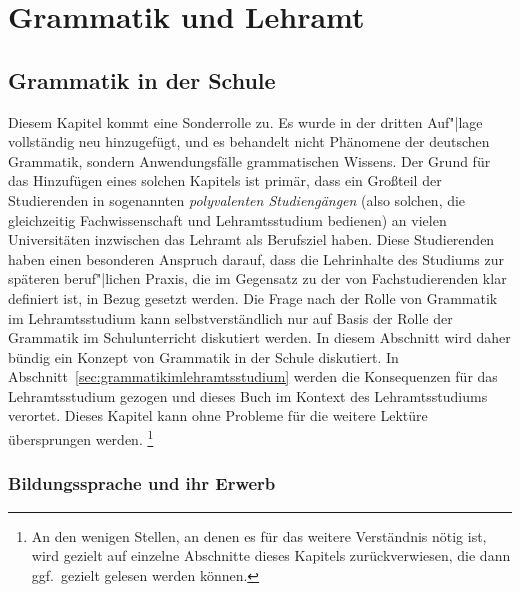 \chapter{Grammatik und Lehramt}
\label{sec:grammatikundlehramt}


\section{Grammatik in der Schule}
\label{sec:grammatikinderschule}

Diesem Kapitel kommt eine Sonderrolle zu.
Es wurde in der dritten Auf"|lage vollständig neu hinzugefügt, und es behandelt nicht Phänomene der deutschen Grammatik, sondern Anwendungsfälle grammatischen Wissens.
Der Grund für das Hinzufügen eines solchen Kapitels ist primär, dass ein Großteil der Studierenden in sogenannten \textit{polyvalenten Studiengängen} (also solchen, die gleichzeitig Fachwissenschaft und Lehramtsstudium bedienen) an vielen Universitäten inzwischen das Lehramt als Berufsziel haben.
Diese Studierenden haben einen besonderen Anspruch darauf, dass die Lehrinhalte des Studiums zur späteren beruf"|lichen Praxis, die im Gegensatz zu der von Fachstudierenden klar definiert ist, in Bezug gesetzt werden.
Die Frage nach der Rolle von Grammatik im Lehramtsstudium kann selbstverständlich nur auf Basis der Rolle der Grammatik im Schulunterricht diskutiert werden.
In diesem Abschnitt wird daher bündig ein Konzept von Grammatik in der Schule diskutiert.
In Abschnitt~\ref{sec:grammatikimlehramtsstudium} werden die Konsequenzen für das Lehramtsstudium gezogen und dieses Buch im Kontext des Lehramtsstudiums verortet.
Dieses Kapitel kann ohne Probleme für die weitere Lektüre übersprungen werden.%
\footnote{An den wenigen Stellen, an denen es für das weitere Verständnis nötig ist, wird gezielt auf einzelne Abschnitte dieses Kapitels zurückverwiesen, die dann ggf.\ gezielt gelesen werden können.}

\subsection{Bildungssprache und ihr Erwerb}
\label{sec:bildungsspracheundihrerwerb}

